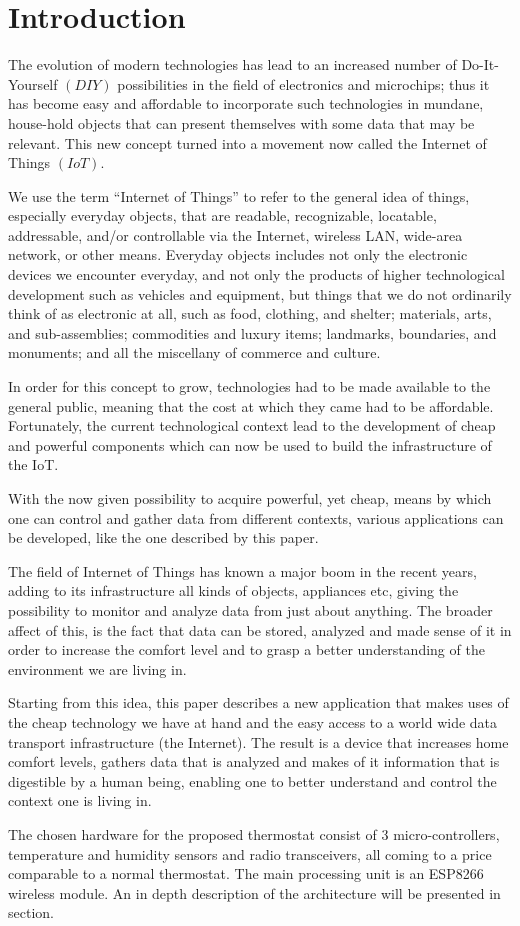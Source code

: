\chapter*{Introduction}

\qquad The evolution of modern technologies has lead to an increased number of Do-It-Yourself $(DIY)$ possibilities in
the field of electronics and microchips; thus it has become easy and affordable to incorporate such
technologies in mundane, house-hold objects that can present themselves with some data that may be relevant.
This new concept turned into a movement now called the Internet of Things $(IoT)$.

We use the term “Internet of Things” to refer to the general idea of things, especially everyday objects, that
are readable, recognizable, locatable, addressable, and/or controllable via the Internet,
wireless LAN, wide-area network, or other means. Everyday objects includes not only the electronic devices we
encounter everyday, and not only the products of higher technological development such as vehicles and
equipment, but things that we do not ordinarily think of as electronic at all, such as food, clothing, and
shelter; materials, arts, and sub-assemblies; commodities and luxury items; landmarks, boundaries,
and monuments; and all the miscellany of commerce and culture. \cite{DisruptiveCivilTechnologies}

In order for this concept to grow, technologies had to be made available to the general public, meaning that
the cost at which they came had to be affordable. Fortunately, the current technological context lead to
the development of cheap and powerful components which can now be used to build the infrastructure of the IoT.

With the now given possibility to acquire powerful, yet cheap, means by which one can control and gather data
from different contexts, various applications can be developed, like the one described by this paper.

The field of Internet of Things has known a major boom in the recent years, adding to its infrastructure
all kinds of objects, appliances etc, giving the possibility to monitor and analyze data from just about
anything. The broader affect of this, is the fact that data can be stored, analyzed and made sense of it
in order to increase the comfort level and to grasp a better understanding of the environment we are living in.

Starting from this idea, this paper describes a new application that makes uses of the cheap technology we
have at hand and the easy access to a world wide data transport infrastructure (the Internet). The result is
a device that increases home comfort levels, gathers data that is analyzed and makes of it information that
is digestible by a human being, enabling one to better understand and control the context one is living in.

The chosen hardware for the proposed thermostat consist of 3 micro-controllers, temperature and humidity sensors
and radio transceivers, all coming to a price comparable to a normal thermostat. The main processing unit
is an ESP8266 wireless module. An in depth description of the architecture will be presented in
section.

